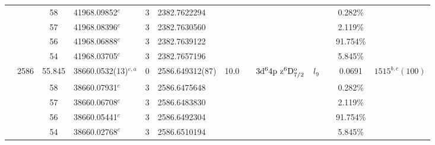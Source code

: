 \begin{table*}
\begin{center}
{\begin{tabular}{:l;l;c;l;c;l;c;l;l;c;c;c;c}
\rowstyle{\itshape}               &        & 58        & 41968.09852$^{c}$                & 3 &  2382.7622294      &      & $                                        $ & $                                        $ & $      $ &              & 0.282\%   & $     ^{}     $\\
\rowstyle{\itshape}               &        & 57        & 41968.08396$^{c}$                & 3 &  2382.7630560      &      & $                                        $ & $                                        $ & $      $ &              & 2.119\%   & $     ^{}     $\\
\rowstyle{\itshape}               &        & 56        & 41968.06888$^{c}$                & 3 &  2382.7639122      &      & $                                        $ & $                                        $ & $      $ &              & 91.754\%  & $     ^{}     $\\
\rowstyle{\itshape}               &        & 54        & 41968.03705$^{c}$                & 3 &  2382.7657196      &      & $                                        $ & $                                        $ & $      $ &              & 5.845\%   & $     ^{}     $\\
                                  & 2586   & 55.845    & 38660.0532(13)$^{e,a}$           & 0 &   2586.649312(87)  & 10.0 & $                                        $ & $3\rm{d}^64\rm{p~z}^6\rm{D}_{7/2}^{\rm o}$ & $l_{9} $ &              & 0.0691    & $ 1515^{b,c}(100)$\\
\rowstyle{\itshape}               &        & 58        & 38660.07931$^{c}$                & 3 &  2586.6475648      &      & $                                        $ & $                                        $ & $      $ &              & 0.282\%   & $     ^{}     $\\
\rowstyle{\itshape}               &        & 57        & 38660.06708$^{c}$                & 3 &  2586.6483830      &      & $                                        $ & $                                        $ & $      $ &              & 2.119\%   & $     ^{}     $\\
\rowstyle{\itshape}               &        & 56        & 38660.05441$^{c}$                & 3 &  2586.6492304      &      & $                                        $ & $                                        $ & $      $ &              & 91.754\%  & $     ^{}     $\\
\rowstyle{\itshape}               &        & 54        & 38660.02768$^{c}$                & 3 &  2586.6510194      &      & $                                        $ & $                                        $ & $      $ &              & 5.845\%   & $     ^{}     $\\

\end{tabular}}
\end{center}
\end{table*}
